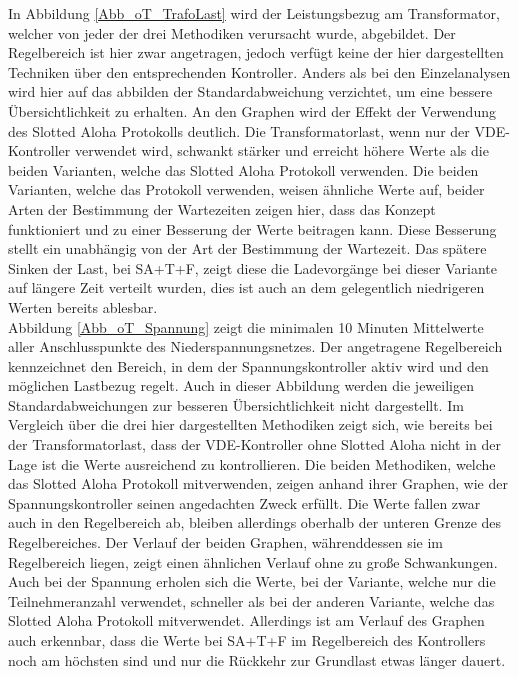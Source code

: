 In Abbildung \ref{Abb_oT_TrafoLast} wird der Leistungsbezug am Transformator, welcher von jeder der drei Methodiken verursacht wurde, abgebildet. Der Regelbereich ist hier zwar angetragen, jedoch verfügt keine der hier dargestellten Techniken über den entsprechenden Kontroller. Anders als bei den Einzelanalysen wird hier auf das abbilden der Standardabweichung verzichtet, um eine bessere Übersichtlichkeit zu erhalten. An den Graphen wird der Effekt der Verwendung des Slotted Aloha Protokolls deutlich. Die Transformatorlast, wenn nur der VDE-Kontroller verwendet wird, schwankt stärker und erreicht höhere Werte als die beiden Varianten, welche das Slotted Aloha Protokoll verwenden. Die beiden Varianten, welche das Protokoll verwenden, weisen ähnliche Werte auf, beider Arten der Bestimmung der Wartezeiten zeigen hier, dass das Konzept funktioniert und zu einer Besserung der Werte beitragen kann. Diese Besserung stellt ein unabhängig von der Art der Bestimmung der Wartezeit. Das spätere Sinken der Last, bei SA+T+F, zeigt diese die Ladevorgänge bei dieser Variante auf längere Zeit verteilt wurden, dies ist auch an dem gelegentlich niedrigeren Werten bereits ablesbar.\\
Abbildung \ref{Abb_oT_Spannung} zeigt die minimalen 10 Minuten Mittelwerte aller Anschlusspunkte des Niederspannungsnetzes. Der angetragene Regelbereich kennzeichnet den Bereich, in dem der Spannungskontroller aktiv wird und den möglichen Lastbezug regelt. Auch in dieser Abbildung werden die jeweiligen Standardabweichungen zur besseren Übersichtlichkeit nicht dargestellt. Im Vergleich über die drei hier dargestellten Methodiken zeigt sich, wie bereits bei der Transformatorlast, dass der VDE-Kontroller ohne Slotted Aloha nicht in der Lage ist die Werte ausreichend zu kontrollieren. Die beiden Methodiken, welche das Slotted Aloha Protokoll mitverwenden, zeigen anhand ihrer Graphen, wie der Spannungskontroller seinen angedachten Zweck erfüllt. Die Werte fallen zwar auch in den Regelbereich ab, bleiben allerdings oberhalb der unteren Grenze des Regelbereiches. Der Verlauf der beiden Graphen, währenddessen sie im Regelbereich liegen, zeigt einen ähnlichen Verlauf ohne zu große Schwankungen. Auch bei der Spannung erholen sich die Werte, bei der Variante, welche nur die Teilnehmeranzahl verwendet, schneller als bei der anderen Variante, welche das Slotted Aloha Protokoll mitverwendet. Allerdings ist am Verlauf des Graphen auch erkennbar, dass die Werte bei SA+T+F im Regelbereich des Kontrollers noch am höchsten sind und nur die Rückkehr zur Grundlast etwas länger dauert.
